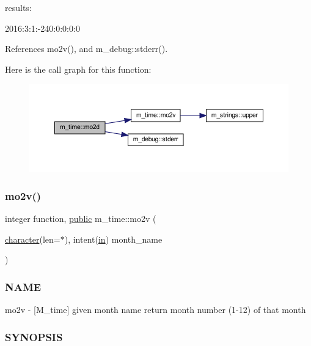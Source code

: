 \begin{DoxyVerb}
\begin{DoxyVerb}
results:

   2016:3:1:-240:0:0:0:0 \end{DoxyVerb}
 

References mo2v(), and m\+\_\+debug\+::stderr().

Here is the call graph for this function\+:
\nopagebreak
\begin{figure}[H]
\begin{center}
\leavevmode
\includegraphics[width=350pt]{namespacem__time_aa5877b420e38077f159482f214b2dc47_cgraph}
\end{center}
\end{figure}
\mbox{\label{namespacem__time_ad7bf0886754757e8961e562f06cf3bb7}} 
\subsubsection{\texorpdfstring{mo2v()}{mo2v()}}
{\footnotesize\ttfamily integer function, \hyperlink{M__stopwatch_83_8txt_a2f74811300c361e53b430611a7d1769f}{public} m\+\_\+time\+::mo2v (\begin{DoxyParamCaption}\item[{\hyperlink{option__stopwatch_83_8txt_abd4b21fbbd175834027b5224bfe97e66}{character}(len=$\ast$), intent(\hyperlink{M__journal_83_8txt_afce72651d1eed785a2132bee863b2f38}{in})}]{month\+\_\+name }\end{DoxyParamCaption})}



\subsubsection*{N\+A\+ME}

mo2v -\/ \mbox{[}M\+\_\+time\mbox{]} given month name return month number (1-\/12) of that month 

\subsubsection*{S\+Y\+N\+O\+P\+S\+IS}


\end{DoxyVerb}
